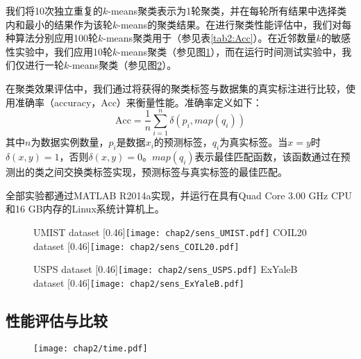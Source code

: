 \begin{itemize}
我们将10次独立重复的$k$-means聚类表示为1轮聚类，并在每轮所有结果中选择类内和最小的结果作为该轮$k$-means的聚类结果。在进行聚类性能评估中，我们对每种算法分别应用100轮$k$-means聚类用于（参见表\ref{tab2:Acc}）。在近邻数量$k$的敏感性实验中，我们应用10轮$k$-means聚类（参见图\ref{fig2:Sen}），而在运行时间测试实验中，我们仅进行一轮$k$-means聚类（参见图\ref{fig2:Time}）。

在聚类效果评估中，我们通过将获得的聚类标签与数据集的真实标注进行比较，使用准确率（accuracy，Acc）来衡量性能。准确率定义如下：
\begin{equation}
	\mathrm{Acc} = \frac{1}{n}\sum^{n}_{i=1}\delta(p_i, map(q_i))
\end{equation}
其中$n$为数据实例数量，$p_i$是数据$x_i$的预测标签，$q_i$为真实标签。当$x=y$时$\delta(x, y) = 1$，否则$\delta(x,y) = 0$。$map(q_i)$表示最佳匹配函数，该函数通过在预测出的类之间交换类标签实现，预测标签与真实标签的最佳匹配。

全部实验都通过MATLAB R2014a实现，并运行在具有Quad Core 3.00 GHz CPU和16 GB内存的Linux系统计算机上。

\begin{figure}[!htbp]
	\centering
					{UMIST dataset}
					[0.46\textwidth]{\texttt{[image: chap2/sens\_UMIST.pdf]}}
	\hspace{1em}
					{COIL20 dataset}
					[0.46\textwidth]{\texttt{[image: chap2/sens\_COIL20.pdf]}}

	\centering
					{USPS dataset}
					[0.46\textwidth]{\texttt{[image: chap2/sens\_USPS.pdf]}}
	\hspace{1em}
					{ExYaleB dataset}
					[0.46\textwidth]{\texttt{[image: chap2/sens\_ExYaleB.pdf]}}
	\label{fig2:Sen}
\end{figure} 

\subsection{性能评估与比较}
\begin{figure}[!htbp]
	\centering
	\texttt{[image: chap2/time.pdf]}
	\label{fig2:Time}
\end{figure}


\end{itemize}
